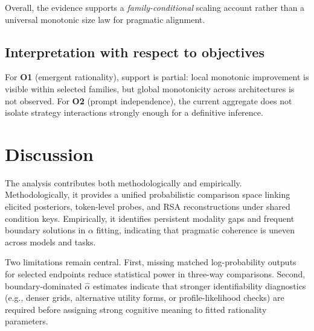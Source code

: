 \documentclass[11pt]{article}
\begin{document}
Overall, the evidence supports a \emph{family-conditional} scaling account rather than a universal monotonic size law for pragmatic alignment.

\subsection{Interpretation with respect to objectives}

For \textbf{O1} (emergent rationality), support is partial: local monotonic improvement is visible within selected families, but global monotonicity across architectures is not observed. For \textbf{O2} (prompt independence), the current aggregate does not isolate strategy interactions strongly enough for a definitive inference.

\section{Discussion}

\label{Discussion}

The analysis contributes both methodologically and empirically. Methodologically, it provides a unified probabilistic comparison space linking elicited posteriors, token-level probes, and RSA reconstructions under shared condition keys. Empirically, it identifies persistent modality gaps and frequent boundary solutions in $\alpha$ fitting, indicating that pragmatic coherence is uneven across models and tasks.

Two limitations remain central. First, missing matched log-probability outputs for selected endpoints reduce statistical power in three-way comparisons. Second, boundary-dominated $\hat\alpha$ estimates indicate that stronger identifiability diagnostics (e.g., denser grids, alternative utility forms, or profile-likelihood checks) are required before assigning strong cognitive meaning to fitted rationality parameters.

\noindent\begingroup
\setlength{\fboxsep}{5pt}\setlength{\fboxrule}{0.6pt}
\endgroup
\end{document}
